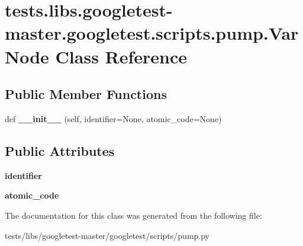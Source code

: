 \hypertarget{classtests_1_1libs_1_1googletest-master_1_1googletest_1_1scripts_1_1pump_1_1VarNode}{}\section{tests.\+libs.\+googletest-\/master.googletest.\+scripts.\+pump.\+Var\+Node Class Reference}
\label{classtests_1_1libs_1_1googletest-master_1_1googletest_1_1scripts_1_1pump_1_1VarNode}
\subsection*{Public Member Functions}
\begin{DoxyCompactItemize}
\item 
\mbox{\label{classtests_1_1libs_1_1googletest-master_1_1googletest_1_1scripts_1_1pump_1_1VarNode_a699c8bc5b8a20b20c9f80a68814297f2}} 
def {\bfseries \+\_\+\+\_\+init\+\_\+\+\_\+} (self, identifier=None, atomic\+\_\+code=None)
\end{DoxyCompactItemize}
\subsection*{Public Attributes}
\begin{DoxyCompactItemize}
\item 
\mbox{\label{classtests_1_1libs_1_1googletest-master_1_1googletest_1_1scripts_1_1pump_1_1VarNode_ad2d821a920dce501a22ffd8da464a751}} 
{\bfseries identifier}
\item 
\mbox{\label{classtests_1_1libs_1_1googletest-master_1_1googletest_1_1scripts_1_1pump_1_1VarNode_a5583cb3d988e4ea8de109c4bc04b9cc7}} 
{\bfseries atomic\+\_\+code}
\end{DoxyCompactItemize}


The documentation for this class was generated from the following file\+:\begin{DoxyCompactItemize}
\item 
tests/libs/googletest-\/master/googletest/scripts/pump.\+py\end{DoxyCompactItemize}
